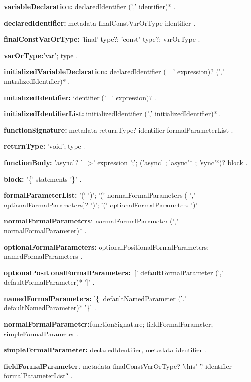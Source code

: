  
\begin{grammar}
{\bf variableDeclaration:}
    declaredIdentifier (',' identifier)*
    .

{\bf declaredIdentifier:}
    metadata finalConstVarOrType identifier
    .

{\bf finalConstVarOrType:}
    'final' type?;
    'const' type?;
    varOrType
    .

{\bf varOrType:}'var';
    type
    .

{\bf initializedVariableDeclaration:}
    declaredIdentifier ('=' expression)? (',' initializedIdentifier)*
    .

{\bf initializedIdentifier:}
    identifier ('=' expression)?
    .

{\bf initializedIdentifierList:}
    initializedIdentifier (',' initializedIdentifier)*
    .
\end{grammar}
\begin{grammar}
{\bf functionSignature:}
    metadata returnType? identifier formalParameterList
    .
    
{\bf returnType:}
    'void';
    type
    .

{\bf functionBody:}
    'async'?  '=>' expression ';';
    ('async' ; 'async'* ; 'sync'*)? block
    .

{\bf block:}
    '\{' statements '\}'
    .
\end{grammar}
\begin{grammar}
{\bf formalParameterList:}
    '(' ')';
    '(' normalFormalParameters ( ','  optionalFormalParameters)? ')';
    '(' optionalFormalParameters ')'
    .
\end{grammar}
\begin{grammar}
{\bf normalFormalParameters:}
    normalFormalParameter (',' normalFormalParameter)*
    .

{\bf optionalFormalParameters:}
    optionalPositionalFormalParameters;
    namedFormalParameters
    .

{\bf optionalPositionalFormalParameters:}
    '[' defaultFormalParameter (',' defaultFormalParameter)* ']'
    .

{\bf namedFormalParameters:}
    '\{' defaultNamedParameter (',' defaultNamedParameter)* '\}'
    .
\end{grammar}
\begin{grammar}
{\bf normalFormalParameter:}functionSignature;
    fieldFormalParameter;
    simpleFormalParameter
    .

{\bf simpleFormalParameter:}
    declaredIdentifier;
    metadata identifier
    .

{\bf fieldFormalParameter:}
    metadata finalConstVarOrType? 'this' '.' identifier formalParameterList?
    .
\end{grammar}
